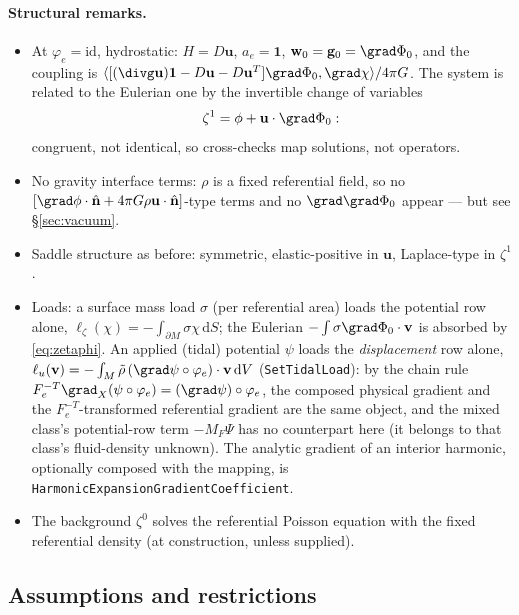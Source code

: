 \documentclass[11pt]{article}
\numberwithin{equation}{section}
\theoremstyle{remark}
\newcommand{\dS}{\,\mathrm{d}S}
\newcommand{\dV}{\,\mathrm{d}V}
\newcommand{\vu}{\mathbf{u}}
\newcommand{\vv}{\mathbf{v}}
\newcommand{\vw}{\mathbf{w}}
\newcommand{\vn}{\hat{\mathbf{n}}}
\newcommand{\vg}{\mathbf{g}}
\newcommand{\code}[1]{\texttt{#1}}
\begin{document}
\paragraph{Structural remarks.}
\begin{itemize}
\item At $\varphi_e = \mathrm{id}$, hydrostatic: $H = D\vu$, $a_e =
  \mathbf{1}$, $\vw_0 = \vg_0 = \grad\Phi_0$, and the coupling is
  $\langle[(\divg\vu)\mathbf{1} - D\vu - D\vu^T]\grad\Phi_0,\grad\chi
  \rangle/4\pi G$. The system is related to the Eulerian one by the
  invertible change of variables
  \begin{equation}
    \zeta^1 = \phi + \vu\cdot\grad\Phi_0 :
    \label{eq:zetaphi}
  \end{equation}
  congruent, not identical, so cross-checks map solutions, not operators.
\item No gravity interface terms: $\rho$ is a fixed referential field, so
  no $[\grad\phi\cdot\vn + 4\pi G\rho\vu\cdot\vn]$-type terms and no
  $\grad\grad\Phi_0$ appear --- but see \S\ref{sec:vacuum}.
\item Saddle structure as before: symmetric, elastic-positive in $\vu$,
  Laplace-type in $\zeta^1$.
\item Loads: a surface mass load $\sigma$ (per referential area) loads the
  potential row alone, $\ell_\zeta(\chi) = -\int_{\partial M}\sigma\chi\dS$;
  the Eulerian $-\int\sigma\grad\Phi_0\cdot\vv$ is absorbed by
  \eqref{eq:zetaphi}. An applied (tidal) potential $\psi$ loads the
  \emph{displacement} row alone,
  $\ell_u(\vv) = -\int_M \tilde\rho\,(\grad\psi\circ\varphi_e)\cdot\vv\dV$
  (\code{SetTidalLoad}): by the chain rule
  $F_e^{-T}\grad_X(\psi\circ\varphi_e) = (\grad\psi)\circ\varphi_e$,
  the composed physical gradient and the $F_e^{-T}$-transformed
  referential gradient are the same object, and the mixed class's
  potential-row term $-M_F\Psi$ has no counterpart here (it belongs to
  that class's fluid-density unknown). The analytic gradient of an
  interior harmonic, optionally composed with the mapping, is
  \code{HarmonicExpansionGradientCoefficient}.
\item The background $\zeta^0$ solves the referential Poisson equation with
  the fixed referential density (at construction, unless supplied).
\end{itemize}

\subsection{Assumptions and restrictions}
\end{document}
